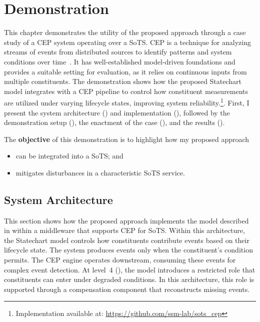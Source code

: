 \chapter{Demonstration}\label{ch:demonstration}
This chapter demonstrates the utility of the proposed approach through a case study of a CEP system operating over a SoTS. CEP is a technique for analyzing streams of events from distributed sources to identify patterns and system conditions over time~\cite{flouris2017issues}. It has well-established model-driven foundations \cite{david2018foundations} and provides a suitable setting for evaluation, as it relies on continuous inputs from multiple constituents. The demonstration shows how the proposed Statechart model integrates with a CEP pipeline to control how constituent measurements are utilized under varying lifecycle states, improving system reliability.\footnote{Implementation available at: \url{https://github.com/ssm-lab/sots_cep}}. First, I present the system architecture () and implementation (), followed by the demonstration setup (), the enactment of the case (), and the results ().

The \textbf{objective} of this demonstration is to highlight how my proposed approach
\begin{itemize}[noitemsep, topsep=0pt]
    \item can be integrated into a SoTS; and
    \item mitigates disturbances in a characteristic SoTS service.
\end{itemize}

\section{System Architecture}\label{sec:architecture}
This section shows how the proposed approach implements the model described in  within a middleware that supports CEP for SoTS. Within this architecture, the Statechart model controls how constituents contribute events based on their lifecycle state. The system produces events only when the constituent's condition permits. The CEP engine operates downstream, consuming these events for complex event detection. At level~4 (), the model introduces a restricted role that constituents can enter under degraded conditions. In this architecture, this role is supported through a compensation component that reconstructs missing events.


